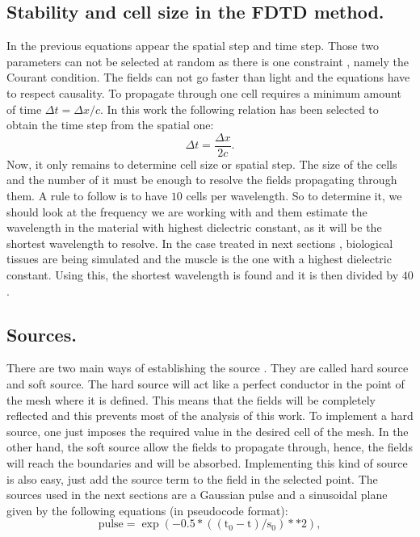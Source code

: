 \documentclass[12pt, oneside]{book}
\begin{document}
\subsection{Stability and cell size in the FDTD method.}
In the previous equations appear the spatial step and time step. Those two parameters can not be selected at random as there is one constraint \cite{taflove2005computational}, namely the Courant condition. The fields can not go faster than light and the equations have to respect causality. To propagate through one cell requires a minimum amount of time $\Delta t= \Delta x/c$. In this work the following relation has been selected to obtain the time step from the spatial one:
\begin{equation}
\Delta t= \frac{\Delta x}{2c}.
\end{equation}
\indent Now, it only remains to determine cell size or spatial step. The size of the cells and the number of it must be enough to resolve the fields propagating through them. A rule to follow is to have $10$ cells per wavelength. So to determine it, we should look at the frequency we are working with and them estimate the wavelength in the material with highest dielectric constant, as it will be the shortest wavelength to resolve. In the case treated in next sections \cite{smith2012stochastic}, biological tissues are being simulated and the muscle is the one with a highest dielectric constant. Using this, the shortest wavelength is found and it is then divided by $40$.


\subsection{Sources.}
There are two main ways of establishing the source \cite{taflove2005computational,Mansourabadi2008}. They are called hard source and soft source. The hard source will act like a perfect conductor in the point of the mesh where it is defined. This means that the fields will be completely reflected and this prevents most of the analysis of this work. To implement a hard source, one just imposes the required value in the desired cell of the mesh. In the other hand, the soft source allow the fields to propagate through, hence, the fields will reach the boundaries and will be absorbed. Implementing this kind of source is also easy, just add the source term to the field in the selected point. The sources used in the next sections are 
a Gaussian pulse and a sinusoidal plane given by the following equations (in pseudocode format):
\begin{equation}
\text{pulse} = \exp( -0.5 *( ( \text{t}_0 - \text{t}) / \text{s}_0 )**2),
\end{equation}
\end{document}
